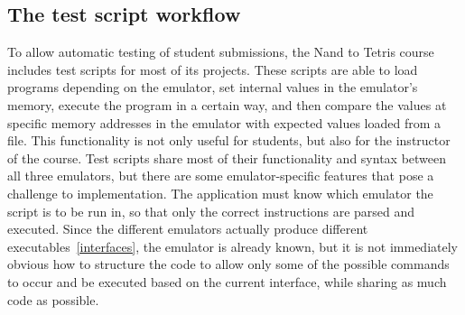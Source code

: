 \subsection{The test script workflow} \label{test-script-workflow}
To allow automatic testing of student submissions, the Nand to Tetris course includes test scripts for most of its projects.
These scripts are able to load programs depending on the emulator, set internal values in the emulator's memory, execute the program in a certain way, and then compare the values at specific memory addresses in the emulator with expected values loaded from a file.
This functionality is not only useful for students, but also for the instructor of the course.
Test scripts share most of their functionality and syntax between all three emulators, but there are some emulator-specific features that pose a challenge to implementation.
The application must know which emulator the script is to be run in, so that only the correct instructions are parsed and executed.
Since the different emulators actually produce different executables~\ref{interfaces}, the emulator is already known, but it is not immediately obvious how to structure the code to allow only some of the possible commands to occur and be executed based on the current interface, while sharing as much code as possible.

